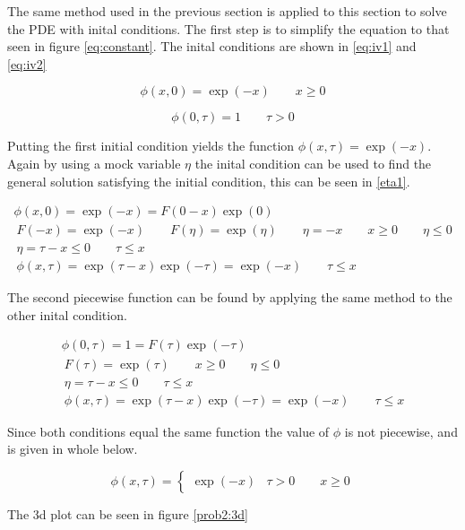 \documentclass[paper=a4, fontsize=11pt]{scrartcl} %
\numberwithin{equation}{section} %
\numberwithin{figure}{section} %
\numberwithin{table}{section} %
\begin{document}
The same method used in the previous section is applied to this section to solve the PDE with inital conditions. The first step is to simplify the equation to that seen in figure \ref{eq:constant}. The inital conditions are shown in \ref{eq:iv1} and \ref{eq:iv2}

\begin{equation}\label{eq:iv1}
	\phi(x,0) = \exp(-x) \qquad x \ge 0
\end{equation}

\begin{equation}\label{eq:iv2}
	\phi(0,\tau) = 1 \qquad \tau > 0
\end{equation}

Putting the first initial condition yields the function $\phi(x,\tau) = \exp(-x)$. Again by using a mock variable $\eta$ the inital condition can be used to find the general solution satisfying the initial condition, this can be seen in \ref{eta1}. 

	\begin{align}
		\phi(x,0) = \exp(-x) = F(0-x)\exp(0) \\
		~
		F(-x) = \exp(-x) \qquad F(\eta) = \exp(\eta) \qquad \eta = -x \qquad x \ge 0 \qquad \eta \le 0 \\
		~
		\eta = \tau-x \le 0 \qquad \tau \le x \label{eta1}\\
		~
		\phi(x,\tau) = \exp(\tau-x)\exp(-\tau) = \exp(-x) \qquad \tau \le x
	\end{align}

The second piecewise function can be found by applying the same method to the other inital condition.

	\begin{align}
		\phi(0,\tau) = 1 = F(\tau)\exp(-\tau) \\
		~
		F(\tau) = \exp(\tau) \qquad x \ge 0 \qquad \eta \le 0 \\
		~
		\eta = \tau-x \le 0 \qquad \tau \le x \\
		~
		\phi(x,\tau) = \exp(\tau-x)\exp(-\tau) = \exp(-x) \qquad \tau \le x
	\end{align}

	Since both conditions equal the same function the value of $\phi$ is not piecewise, and is given in whole below.

\[
	\phi(x,\tau) = \begin{cases} 
		\exp(-x) 	& \tau > 0 \qquad x \ge 0
   \end{cases}
\]

The 3d plot can be seen in figure \ref{prob2:3d}
\end{document}
